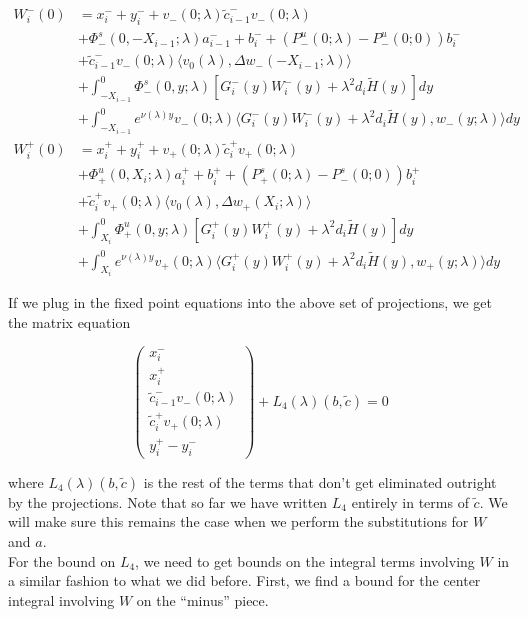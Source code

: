 \documentclass[12pt]{article}
\begin{document}
\begin{align*}
W_i^-(0) &= x_i^- + y_i^- + v_-(0; \lambda) \tilde{c}_{i-1}^- v_-(0; \lambda) \\
&+\Phi^s_-(0, -X_{i-1}; \lambda)a_{i-1}^- + b_i^- + (P^u_-(0; \lambda) - P^u_-(0; 0))b_i^- \\
&+ \tilde{c}_{i-1}^- v_-(0; \lambda) \langle v_0(\lambda), \Delta w_-(-X_{i-1}; \lambda) \rangle \\
&+ \int_{-X_{i-1}}^0 \Phi^s_-(0, y; \lambda) [ G_i^-(y)W_i^-(y) + \lambda^2 d_i \tilde{H}(y) ] dy \\
&+ \int_{-X_{i-1}}^0
e^{\nu(\lambda)y} v_-(0; \lambda) \langle G_i^-(y)W_i^-(y) + \lambda^2 d_i \tilde{H}(y), w_-(y; \lambda) \rangle dy \\
W_i^+(0) &= x_i^+ + y_i^+ + v_+(0; \lambda) \tilde{c}_i^+ v_+(0; \lambda) \\
&+\Phi^u_+(0, X_i; \lambda)a_i^+ + b_i^+ + (P^s_+(0; \lambda) - P^s_-(0; 0))b_i^+ \\
&+ \tilde{c}_i^+ v_+(0; \lambda) \langle v_0(\lambda), \Delta w_+(X_i; \lambda) \rangle \\  
&+ \int_{X_i}^0 \Phi^u_+(0, y; \lambda) [ G_i^+(y)W_i^+(y) + \lambda^2 d_i \tilde{H}(y) ] dy \\
&+ \int_{X_i}^0 e^{\nu(\lambda)y} v_+(0; \lambda) \langle G_i^+(y)W_i^+(y) + \lambda^2 d_i \tilde{H}(y), w_+(y; \lambda) \rangle dy
\end{align*}

If we plug in the fixed point equations into the above set of projections, we get the matrix equation

\[
\begin{pmatrix}x_i^- \\ x_i^+ \\ 
\tilde{c}_{i-1}^- v_-(0; \lambda) \\
\tilde{c}_i^+ v_+(0; \lambda) \\
y_i^+ - y_i^- \end{pmatrix} + L_4(\lambda)(b, \tilde{c}) = 0
\]

where $L_4(\lambda)(b, \tilde{c})$ is the rest of the terms that don't get eliminated outright by the projections. Note that so far we have written $L_4$ entirely in terms of $\tilde{c}$. We will make sure this remains the case when we perform the substitutions for $W$ and $a$.\\

For the bound on $L_4$, we need to get bounds on the integral terms involving $W$ in a similar fashion to what we did before. First, we find a bound for the center integral involving $W$ on the ``minus'' piece.
\end{document}
